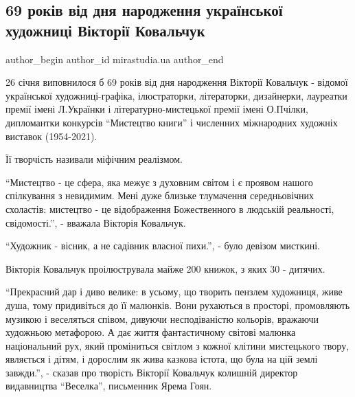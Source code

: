  
 
 
 
 

\subsection{69 років від дня народження української художниці Вікторії Ковальчук}
\label{sec:26_01_2023.fb.mirastudia.ua.1.69_rok_v_v_d_dnya_na}

\ifcmt
 author_begin
   author_id mirastudia.ua
 author_end
\fi

26 січня виповнилося б 69 років від дня народження Вікторії Ковальчук - відомої
української художниці-графіка, ілюстраторки, літераторки, дизайнерки, лауреатки
премії імені Л.Українки і літературно-мистецької премії імені О.Пчілки,
дипломантки конкурсів \enquote{Мистецтво книги} і численних міжнародних художніх
виставок (1954-2021).

Її творчість називали міфічним реалізмом.

\enquote{Мистецтво - це сфера, яка межує з духовним світом і є проявом нашого
спілкування з невидимим. Мені дуже близьке тлумачення середньовічних схоластів:
мистецтво - це відображення Божественного в людській реальності, свідомості.},
- вважала Вікторія Ковальчук.

\enquote{Художник - вісник, а не садівник власної пихи.}, - було девізом мисткині. 

Вікторія Ковальчук проілюструвала майже 200 книжок, з яких 30 - дитячих. 

\enquote{Прекрасний дар і диво велике: в усьому, що творить пензлем художниця, живе
душа, тому придивіться до її малюнків. Вони рухаються в просторі, промовляють
музикою і веселяться співом, дивуючи несподіваністю кольорів, вражаючи
художньою метафорою. А дає життя фантастичному світові малюнка національний
рух, який проміниться світлом з кожної клітини мистецького твору, являється і
дітям, і дорослим як жива казкова істота, що була на цій землі завжди.}, -
сказав про творість Вікторії Ковальчук колишній директор видавництва \enquote{Веселка},
письменник Ярема Гоян. 


